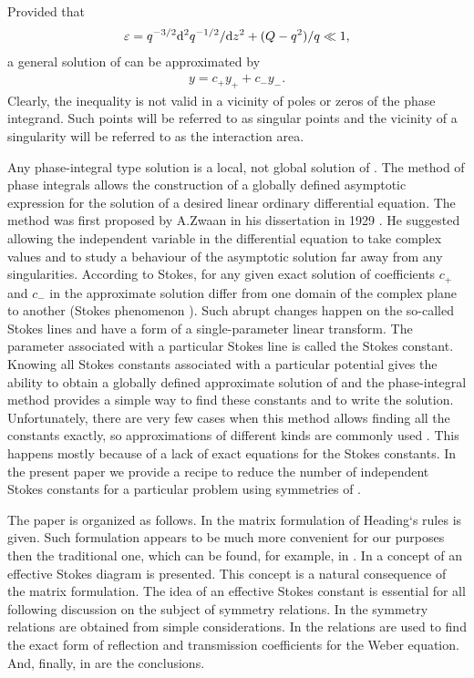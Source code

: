 \documentclass[12pt]{iopart}
\begin{document}
Provided that 
\begin{eqnarray}
\varepsilon = q^{-3/2} \mathrm{d}^2 q^{-1/2}/\mathrm{d} z^2  + (Q - q^2)/q \ll 1,   \label{eq:cond}
\end{eqnarray}
a general solution of  can be approximated by
\begin{eqnarray}
y = c_+y_+ + c_-y_-. \label{eq:gensol}
\end{eqnarray}
Clearly, the inequality  is not valid in a vicinity of poles or zeros of 
the phase integrand. Such points will be referred to as singular points and the 
vicinity of a singularity will be referred to as the interaction area.

Any phase-integral type solution  is a local, not global solution of . 
The method of phase integrals allows the construction of a globally defined 
asymptotic expression for the solution of a desired linear ordinary differential 
equation. The method was first proposed by A.Zwaan in his dissertation in 1929 \cite{zwaan}. 
He suggested allowing the independent variable in the differential equation to take 
complex values and to study a behaviour of the asymptotic solution far away from any 
singularities. According to Stokes\cite{stokes}, for any given exact solution 
of  coefficients $c_+$ and $c_-$ in the approximate solution  
differ from one domain of the complex plane to another 
(Stokes phenomenon \cite{stokes,white,heading,frbook}). Such abrupt 
changes happen on the so-called Stokes lines and have a form of a single-parameter 
linear transform\cite{heading}. The parameter associated with a particular Stokes line 
is called the Stokes constant. Knowing all Stokes constants associated with a particular 
potential gives the ability to obtain a globally defined approximate solution 
of \cite{heading,white} and the phase-integral method provides a simple 
way to find these constants and to write the solution. Unfortunately, there are very few 
cases when this method allows finding all the constants exactly, so approximations of different 
kinds are commonly used \cite{white,ours}. This happens mostly because of a lack of 
exact equations for the Stokes constants. In the present paper we provide a recipe to reduce the number 
of independent Stokes constants for a particular problem using symmetries of .

The paper is organized as follows. 
In  the matrix formulation of Heading`s rules is given. Such formulation appears
to be much more convenient for our purposes then the traditional one, which can be found, 
for example, in \cite{white}.
In  a concept of an effective Stokes diagram is presented. This concept is a natural
consequence of the matrix formulation. The idea of an effective Stokes constant is
essential for all following discussion on the subject of symmetry relations.
In  the symmetry relations are obtained from simple considerations. 
In  the relations are used to find the exact form of reflection and 
transmission coefficients for the Weber equation. 
And, finally, in  are the conclusions. 
\end{document}
